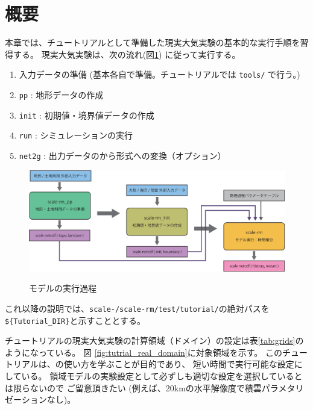 \section{概要} \label{sec:tutrial_real_intro}
本章では、チュートリアルとして準備した現実大気実験の基本的な実行手順を習得する。
現実大気実験は、次の流れ(図\ref{fig:howto}) に従って実行する。
\begin{enumerate}
\item  入力データの準備 (基本各自で準備。チュートリアルでは \verb|tools/| で行う。)
\item  \texttt{pp}      : 地形データの作成
\item  \texttt{init}    : 初期値・境界値データの作成
\item  \texttt{run}     : シミュレーションの実行
\item  \texttt{net2g}   : 出力データの\netcdf から\grads 形式への変換（オプション）
\end{enumerate}

\begin{figure}[b]
\begin{center}
  \includegraphics[width=0.9\hsize]{./figure/real_procedure.eps}\\
  \caption{\scalerm モデルの実行過程}
  \label{fig:howto}
\end{center}
\end{figure}


これ以降の説明では、\texttt{scale-{\version}/scale-rm/test/tutorial/}の絶対パスを
\verb|${Tutorial_DIR}|と示すこととする。


チュートリアルの現実大気実験の計算領域（ドメイン）の設定は表\ref{tab:grids}のようになっている。
図 \ref{fig:tutrial_real_domain}に対象領域を示す。
このチュートリアルは、\scalerm の使い方を学ぶことが目的であり、
短い時間で実行可能な設定にしている。
領域モデルの実験設定として必ずしも適切な設定を選択しているとは限らないので
ご留意頂きたい
(例えば、20kmの水平解像度で積雲パラメタリゼーションなし)。


